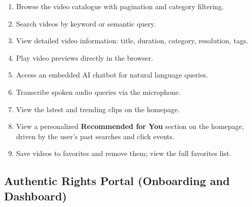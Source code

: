 \begin{enumerate}[label=\textbf{FR-VP-\arabic*}]
  \item Browse the video catalogue with pagination and category filtering.
  \item Search videos by keyword or semantic query.
  \item View detailed video information: title, duration, category, resolution, tags.
  \item Play video previews directly in the browser.
  \item Access an embedded AI chatbot for natural language queries.
  \item Transcribe spoken audio queries via the microphone.
  \item View the latest and trending clips on the homepage.
  \item View a personalized \textbf{Recommended for You} section on the homepage, driven by
    the user's past searches and click events.
  \item Save videos to favorites and remove them; view the full favorites list.
\end{enumerate}

\subsection{Authentic Rights Portal (Onboarding and Dashboard)}

